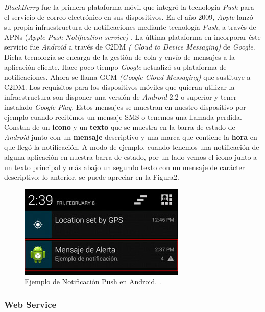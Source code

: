 \textit{BlackBerry} fue la primera plataforma móvil que integró la tecnología \textit{Push} para el servicio de correo electrónico en sus dispositivos. En el año 2009, \textit{Apple} lanzó su propia infraestructura de notificaciones mediante tecnología \textit{Push}, a través de APNs (\textit{Apple Push Notification service)} . La última plataforma en incorporar éste servicio fue \textit{Android} a través de C2DM \textit{( Cloud to Device Messaging)} de \textit{Google}. Dicha tecnología se encarga de la gestión de cola y envío de mensajes a la aplicación cliente. Hace poco tiempo \textit{Google} actualizó su plataforma de notificaciones. Ahora se llama GCM \textit{(Google Cloud Messaging)} que sustituye a C2DM. Los requisitos para los dispositivos móviles que quieran utilizar la infraestructura son disponer una versión de \textit{Android} 2.2 o superior y tener instalado \textit{Google Play}. Estos mensajes se muestran en nuestro dispositivo por ejemplo cuando recibimos un mensaje SMS o tenemos una llamada perdida. Constan de un \textbf{icono} y un \textbf{texto} que se muestra en la barra de estado de \textit{Android} junto con un \textbf{mensaje} descriptivo y una marca que contiene la \textbf{hora} en que llegó la notificación. A modo de ejemplo, cuando tenemos una notificación de alguna aplicación en nuestra barra de estado, por un lado vemos el icono junto a un texto principal y más abajo un segundo texto con un mensaje de carácter descriptivo; lo anterior, se puede apreciar en la Figura2.\\

\begin{figure}[H]
\centering
\includegraphics[scale=0.65]{images/capitulo2/notificacionPush.jpg}
\caption{Ejemplo de Notificación Push en Android. \cite{Sgo11g}.}
\label{notificacionPush}
\end{figure}


\subsubsection{Web Service}

